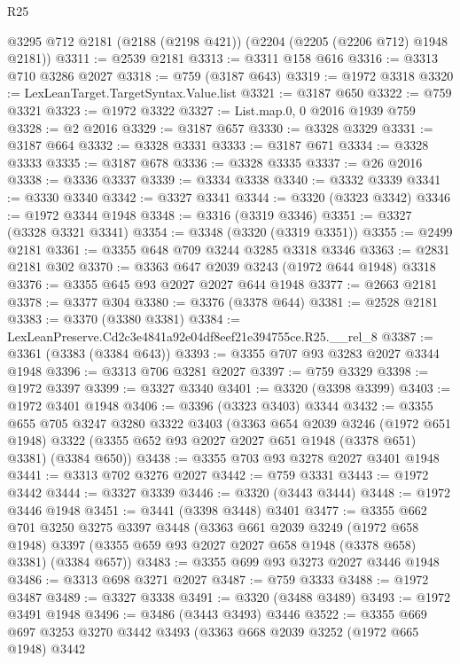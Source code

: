 \begin{lexlean}{R25}
\begin{coremodule}
    @3295
    @712
    @2181
    (@2188 (@2198 @421))
    (@2204 (@2205 (@2206 @712) @1948 @2181))
@3311 := @2539 @2181
@3313 := @3311 @158 @616
@3316 := @3313 @710 @3286 @2027
@3318 := @759 (@3187 @643)
@3319 := @1972 @3318
@3320 := LexLeanTarget.TargetSyntax.Value.list
@3321 := @3187 @650
@3322 := @759 @3321
@3323 := @1972 @3322
@3327 := List.map.{0, 0} @2016 @1939 @759
@3328 := @2 @2016
@3329 := @3187 @657
@3330 := @3328 @3329
@3331 := @3187 @664
@3332 := @3328 @3331
@3333 := @3187 @671
@3334 := @3328 @3333
@3335 := @3187 @678
@3336 := @3328 @3335
@3337 := @26 @2016
@3338 := @3336 @3337
@3339 := @3334 @3338
@3340 := @3332 @3339
@3341 := @3330 @3340
@3342 := @3327 @3341
@3344 := @3320 (@3323 @3342)
@3346 := @1972 @3344 @1948
@3348 := @3316 (@3319 @3346)
@3351 := @3327 (@3328 @3321 @3341)
@3354 := @3348 (@3320 (@3319 @3351))
@3355 := @2499 @2181
@3361 := @3355 @648 @709 @3244 @3285 @3318 @3346
@3363 := @2831 @2181 @302
@3370 := @3363 @647 @2039 @3243 (@1972 @644 @1948) @3318
@3376 := @3355 @645 @93 @2027 @2027 @644 @1948
@3377 := @2663 @2181
@3378 := @3377 @304
@3380 := @3376 (@3378 @644)
@3381 := @2528 @2181
@3383 := @3370 (@3380 @3381)
@3384 := LexLeanPreserve.Cd2c3e4841a92e04df8eef21e394755ce.R25.__rel_8
@3387 := @3361 (@3383 (@3384 @643))
@3393 := @3355 @707 @93 @3283 @2027 @3344 @1948
@3396 := @3313 @706 @3281 @2027
@3397 := @759 @3329
@3398 := @1972 @3397
@3399 := @3327 @3340
@3401 := @3320 (@3398 @3399)
@3403 := @1972 @3401 @1948
@3406 := @3396 (@3323 @3403) @3344
@3432 := @3355
    @655
    @705
    @3247
    @3280
    @3322
    @3403
    (@3363
      @654
      @2039
      @3246
      (@1972 @651 @1948)
      @3322
      (@3355 @652 @93 @2027 @2027 @651 @1948 (@3378 @651) @3381)
      (@3384 @650))
@3438 := @3355 @703 @93 @3278 @2027 @3401 @1948
@3441 := @3313 @702 @3276 @2027
@3442 := @759 @3331
@3443 := @1972 @3442
@3444 := @3327 @3339
@3446 := @3320 (@3443 @3444)
@3448 := @1972 @3446 @1948
@3451 := @3441 (@3398 @3448) @3401
@3477 := @3355
    @662
    @701
    @3250
    @3275
    @3397
    @3448
    (@3363
      @661
      @2039
      @3249
      (@1972 @658 @1948)
      @3397
      (@3355 @659 @93 @2027 @2027 @658 @1948 (@3378 @658) @3381)
      (@3384 @657))
@3483 := @3355 @699 @93 @3273 @2027 @3446 @1948
@3486 := @3313 @698 @3271 @2027
@3487 := @759 @3333
@3488 := @1972 @3487
@3489 := @3327 @3338
@3491 := @3320 (@3488 @3489)
@3493 := @1972 @3491 @1948
@3496 := @3486 (@3443 @3493) @3446
@3522 := @3355
    @669
    @697
    @3253
    @3270
    @3442
    @3493
    (@3363
      @668
      @2039
      @3252
      (@1972 @665 @1948)
      @3442

\end{coremodule}
\end{lexlean}

